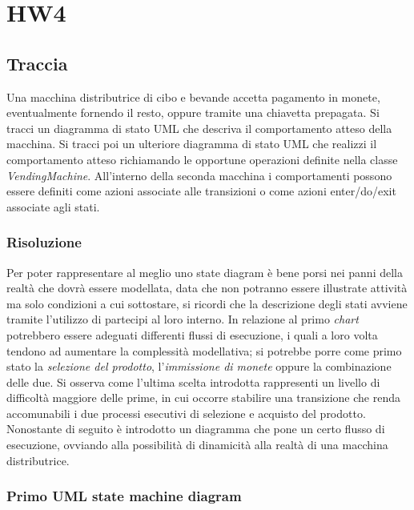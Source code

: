 \documentclass{article}
\begin{document}
\pagestyle{empty}


\section*{HW4}
\large

\subsection*{Traccia}
\large
Una macchina distributrice di cibo e bevande accetta pagamento in monete, eventualmente fornendo il resto, oppure tramite una chiavetta prepagata. Si tracci un diagramma di stato UML che descriva il comportamento atteso della macchina. Si tracci poi un ulteriore diagramma di stato UML che realizzi il comportamento atteso richiamando le opportune operazioni definite nella classe \textit{VendingMachine}. All'interno della seconda macchina i comportamenti possono essere definiti come azioni associate alle transizioni o come azioni enter/do/exit associate agli stati. 

\subsubsection*{Risoluzione}
Per poter rappresentare al meglio uno state diagram è bene porsi nei panni della realtà che dovrà essere modellata, data che non potranno essere illustrate attività ma solo condizioni a cui sottostare, si ricordi che la descrizione degli stati avviene tramite l'utilizzo di partecipi al loro interno. In relazione al primo \textit{chart} potrebbero essere adeguati differenti flussi di esecuzione, i quali a loro volta tendono ad aumentare la complessità modellativa; si potrebbe porre come primo stato la \textit{selezione del prodotto}, l'\textit{immissione di monete} oppure la combinazione delle due. Si osserva come l'ultima scelta introdotta rappresenti un livello di difficoltà maggiore delle prime, in cui occorre stabilire una transizione che renda accomunabili i due processi esecutivi di selezione e acquisto del prodotto.\vspace*{14pt}\\
Nonostante di seguito è introdotto un diagramma che pone un certo flusso di esecuzione, ovviando alla possibilità di dinamicità alla realtà di una macchina distributrice.

\subsubsection*{Primo UML state machine diagram}
\large
\end{document}
